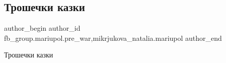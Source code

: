  
 
 
 
 

\subsection{Трошечки казки}
\label{sec:04_02_2023.fb.fb_group.mariupol.pre_war.4.troshechki_kazki}
 
\ifcmt
 author_begin
   author_id fb_group.mariupol.pre_war,mikrjukova_natalia.mariupol
 author_end
\fi

Трошечки казки
